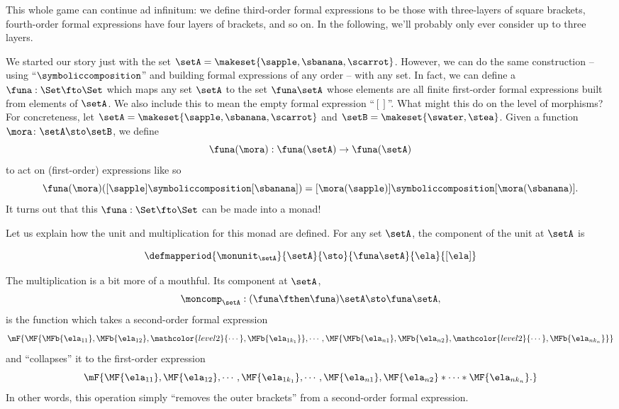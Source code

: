 This whole game can continue ad infinitum: we define third-order formal expressions to be those with three-layers of square brackets, fourth-order formal expressions have four layers of brackets, and so on.
In the following, we'll probably only ever consider up to three layers.

We started our story just with the set $\setA = \makeset{ \sapple, \sbanana, \scarrot }$.
However, we can do the same construction -- using ``$\symboliccomposition$'' and building formal expressions of any order -- with any set.
In fact, we can define a  $\funa: \Set \fto \Set$ which maps any set $\setA$ to the set $\funa \setA$ whose elements are all finite first-order formal expressions built from elements of $\setA$.
We also include this to mean the empty formal expression ``$[ ]$''.
What might this  do on the level of morphisms?
For concreteness, let $\setA = \makeset{ \sapple, \sbanana, \scarrot } $ and $\setB = \makeset{ \swater, \stea }$.
Given a function $\mora \colon \setA \sto \setB$, we define
\begin{equation}
    \funa(\mora) : \funa(\setA) \to \funa(\setA)
\end{equation}
to act on (first-order) expressions like so
\begin{equation}
    \funa(\mora)([\sapple]\symboliccomposition[\sbanana]) = [\mora(\sapple)]\symboliccomposition[\mora(\sbanana)].
\end{equation}
It turns out that this  $\funa: \Set \fto \Set$ can be made into a monad!

Let us explain how the unit and multiplication for this monad are defined.
For any set $\setA$, the component of the unit at $\setA$ is

\begin{equation}
    \defmapperiod{\monunit_\setA}{\setA}{\sto}{\funa \setA}{\ela}{[\ela]}
\end{equation}

The multiplication is a bit more of a mouthful.
Its component at $\setA$,
\begin{equation}
    \moncomp_\setA : (\funa \fthen \funa)\setA \sto \funa \setA,
\end{equation}
is the function which takes a second-order formal expression
\begin{equation}\label{eq:monad-formatl-mult-input}
    \mF{
        \MF{ \MFb{\ela_{11}} , \MFb{\ela_{12}} , \mathcolor{level2}{\cdots} , \MFb{\ela_{1k_1}}}
        , \cdots ,
        \MF{\MFb{\ela_{n1}}, \MFb{\ela_{n2}}, \mathcolor{level2}{\cdots} , \MFb{\ela_{nk_n}}}
    }
\end{equation}
and ``collapses'' it to the first-order expression
\begin{equation}\label{eq:monad-formatl-mult-output}
    \mF { \MF{\ela_{11}}
        , \MF{\ela_{12}} , \cdots , \MF{\ela_{1k_1}}, \cdots, \MF{\ela_{n1}} , \MF{\ela_{n2}} * \cdots * \MF{\ela_{nk_n}}.
    }
\end{equation}
In other words, this operation simply ``removes the outer brackets'' from a second-order formal expression.

